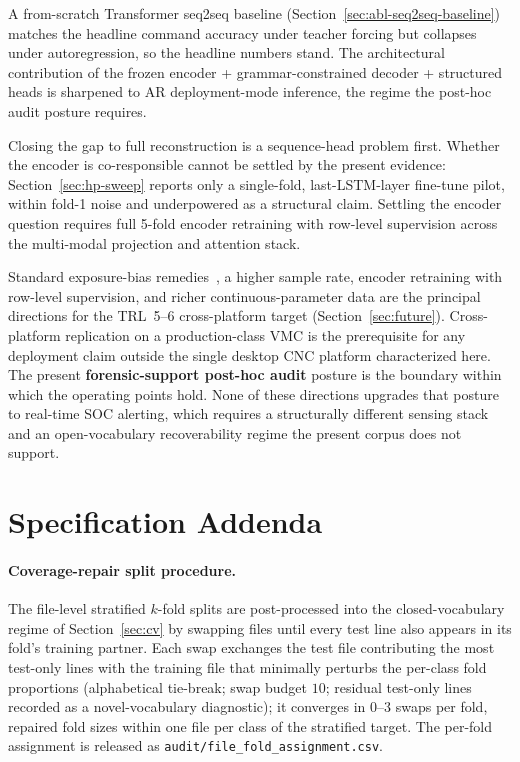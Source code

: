\documentclass[sensors,article,submit,moreauthors,pdftex]{Definitions/mdpi}
\begin{document}
A from-scratch Transformer seq2seq baseline (Section~\ref{sec:abl-seq2seq-baseline}) matches the headline command accuracy under teacher forcing but collapses under autoregression, so the headline numbers stand. The architectural contribution of the frozen encoder + grammar-constrained decoder + structured heads is sharpened to AR deployment-mode inference, the regime the post-hoc audit posture requires.

Closing the gap to full reconstruction is a sequence-head problem first. Whether the encoder is co-responsible cannot be settled by the present evidence: Section~\ref{sec:hp-sweep} reports only a single-fold, last-LSTM-layer fine-tune pilot, within fold-1 noise and underpowered as a structural claim. Settling the encoder question requires full 5-fold encoder retraining with row-level supervision across the multi-modal projection and attention stack.

Standard exposure-bias remedies~\cite{he2019exposure,ott2018uncertainty,ranzato2016sequence,holtzman2020curious,welleck2020neural}, a higher sample rate, encoder retraining with row-level supervision, and richer continuous-parameter data are the principal directions for the TRL~5--6 cross-platform target (Section~\ref{sec:future}). Cross-platform replication on a production-class VMC is the prerequisite for any deployment claim outside the single desktop CNC platform characterized here. The present \textbf{forensic-support post-hoc audit} posture is the boundary within which the operating points hold. None of these directions upgrades that posture to real-time SOC alerting, which requires a structurally different sensing stack and an open-vocabulary recoverability regime the present corpus does not support.

\appendix
\section{Specification Addenda}
\label{app3:addenda}\label{app:spec-addenda}

\paragraph{Coverage-repair split procedure.} The file-level stratified $k$-fold splits are post-processed into the closed-vocabulary regime of Section~\ref{sec:cv} by swapping files until every test line also appears in its fold's training partner. Each swap exchanges the test file contributing the most test-only lines with the training file that minimally perturbs the per-class fold proportions (alphabetical tie-break; swap budget $10$; residual test-only lines recorded as a novel-vocabulary diagnostic); it converges in $0$--$3$ swaps per fold, repaired fold sizes within one file per class of the stratified target. The per-fold assignment is released as \texttt{audit/file\_fold\_assignment.csv}.
\end{document}
